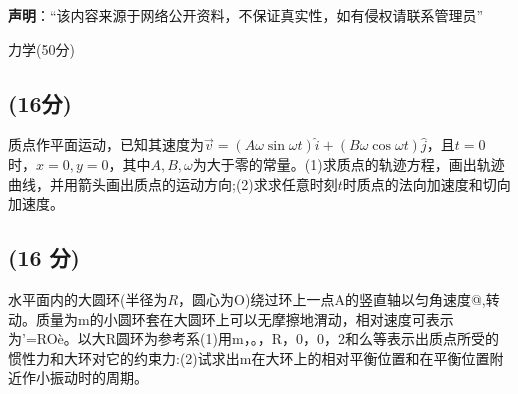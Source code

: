 
\textbf{声明}：“该内容来源于网络公开资料，不保证真实性，如有侵权请联系管理员”

力学(50分)
\subsection{(16分)}
质点作平面运动，已知其速度为$\vec{v} = (A \omega \sin \omega t) \hat{i} + (B \omega \cos \omega t) \hat{j}$，且$t=0$时，$x=0,y=0$，其中$A,B,\omega$为大于零的常量。(1)求质点的轨迹方程，画出轨迹曲线，并用箭头画出质点的运动方向;(2)求求任意时刻$t$时质点的法向加速度和切向
加速度。
\subsection{(16 分)}
水平面内的大圆环(半径为$R$，圆心为O)绕过环上一点A的竖直轴以匀角速度@,转动。质量为m的小圆环套在大圆环上可以无摩擦地渭动，相对速度可表示为’=ROè。以大R圆环为参考系(1)用m，。，R，0，0，2和么等表示出质点所受的惯性力和大环对它的约束力:(2)试求出m在大环上的相对平衡位置和在平衡位置附近作小振动时的周期。






